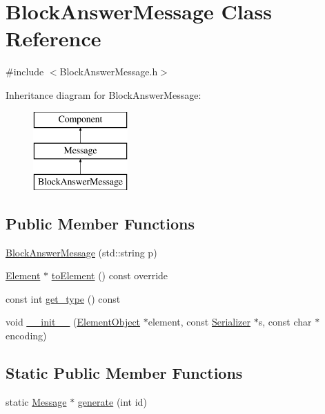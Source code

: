 \hypertarget{classBlockAnswerMessage}{}\section{Block\+Answer\+Message Class Reference}
\label{classBlockAnswerMessage}


{\ttfamily \#include $<$Block\+Answer\+Message.\+h$>$}

Inheritance diagram for Block\+Answer\+Message\+:\begin{figure}[H]
\begin{center}
\leavevmode
\includegraphics[height=3.000000cm]{classBlockAnswerMessage}
\end{center}
\end{figure}
\subsection*{Public Member Functions}
\begin{DoxyCompactItemize}
\item 
\mbox{\hyperlink{classBlockAnswerMessage_a7d562144e7ad2ff1c5ab8fdbc3d27d32}{Block\+Answer\+Message}} (std\+::string p)
\item 
\mbox{\hyperlink{classElement}{Element}} $\ast$ \mbox{\hyperlink{classBlockAnswerMessage_ac7f35ec9f7f2fbcd726628c2a984518b}{to\+Element}} () const override
\item 
const int \mbox{\hyperlink{classMessage_a2a576dcffd45c4574fcdf2897ec26086}{get\+\_\+type}} () const
\item 
void \mbox{\hyperlink{classComponent_a28212595f8ee85fe009bd233bc99b2fc}{\+\_\+\+\_\+init\+\_\+\+\_\+}} (\mbox{\hyperlink{classElementObject}{Element\+Object}} $\ast$element, const \mbox{\hyperlink{classSerializer}{Serializer}} $\ast$s, const char $\ast$encoding)
\end{DoxyCompactItemize}
\subsection*{Static Public Member Functions}
\begin{DoxyCompactItemize}
\item 
static \mbox{\hyperlink{classMessage}{Message}} $\ast$ \mbox{\hyperlink{classMessage_ad92a0e1cfa5b5a503ec9c61833e3e5ea}{generate}} (int id)
\end{DoxyCompactItemize}
